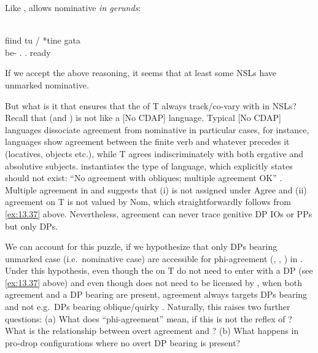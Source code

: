 \documentclass[output=paper]{langsci/langscibook}
\begin{document}
\begin{exe}
Like ,  allows nominative \emph{in
gerunds}:

\ea\label{ex:13.42} \citep{Alboiu2009}\\
    \gll fiind tu / *tine gata\\
    be-\Ger{}    \Ssg.\Nom{} {} \hphantom{*}\Ssg.\Acc{} ready\\
    \glt
\z

If we accept the above reasoning, it seems that at least some \glspl{NSL} have
unmarked nominative.

But what is it that ensures that the  of T always track/co-vary
with \Nom{} in \glspl{NSL}? Recall that  (and ) is not
like a [No \gls{CDAP}] language. Typical [No \gls{CDAP}] languages dissociate
agreement from nominative in particular cases, for instance, 
languages show agreement between the finite verb and whatever precedes it
(locatives, objects etc.), while  T agrees indiscriminately
with both ergative and absolutive subjects.
 instantiates the type of language, which \citet{Baker2008}
explicitly states should not exist: “No agreement with obliques; multiple
agreement OK” \parencite[223, (113d)]{Baker2008}. Multiple agreement in
 and  suggests that (i) \Nom{} is not assigned under
Agree and (ii) agreement on T is not valued by Nom, which straightforwardly
follows from \eqref{ex:13.37} above.  Nevertheless, agreement can never trace
genitive DP \glspl{IO} or PPs but only \Nom{} DPs.

We can account for this puzzle, if we hypothesize that only DPs bearing
unmarked case (i.e.\ nominative case) are accessible for
phi-agreement (\citealt{Bobaljik2008}, \citealt{Preminger2014},
\citealt{Baker2015}) in . Under this hypothesis, even though the
 on T do not need to enter  with a DP (see
\eqref{ex:13.37} above) and even though \Nom{} does not need to be licensed
by , when both agreement and a DP bearing \Nom{} are present,
agreement always targets DPs bearing \Nom{} and not e.g.\ DPs bearing
oblique/quirky \Gen. Naturally, this raises two further questions: (a) What
does \enquote{phi-agreement} mean, if this is not the reflex of ?
What is the relationship between overt agreement and ? (b) What
happens in pro-drop configurations where no overt DP bearing \Nom{} is present?


\end{exe}
\end{document}
